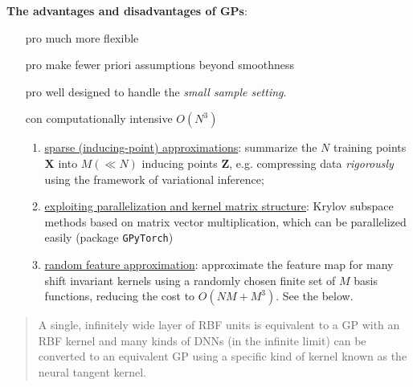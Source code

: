 \textbf{The advantages and disadvantages of GPs}:
\begin{enumerate}[{(1)}]
    \item [pro] much more flexible
    \item [pro] make fewer priori assumptions beyond smoothness
    \item [pro] well designed to handle the \textit{small sample setting}.
    \item [con] computationally intensive $O(N^3)$
    \begin{enumerate}
        \item \uline{sparse (inducing-point) approximations}: 
        summarize the $N$ training points $\mathbf{X}$ into $M(\ll N)$ inducing points $\mathbf{Z}$, 
        e.g. compressing data \textit{rigorously} using the framework of variational inference;
        \item \uline{exploiting parallelization and kernel matrix structure}: 
        Krylov subspace methods based on matrix vector multiplication, 
        which can be parallelized easily (package \texttt{GPyTorch})
        \item \uline{random feature approximation}: approximate the feature map for many shift invariant kernels using a randomly chosen finite set of $M$ basis functions, reducing the cost to $O(NM+M^3)$. See the below.
    \end{enumerate}
\end{enumerate}

\begin{quote}
    A single, infinitely wide layer of RBF units is equivalent to a GP with an RBF kernel and many kinds of DNNs (in the infinite limit) can be converted to an equivalent GP using a specific kind of kernel known as the neural tangent kernel.
\end{quote}

